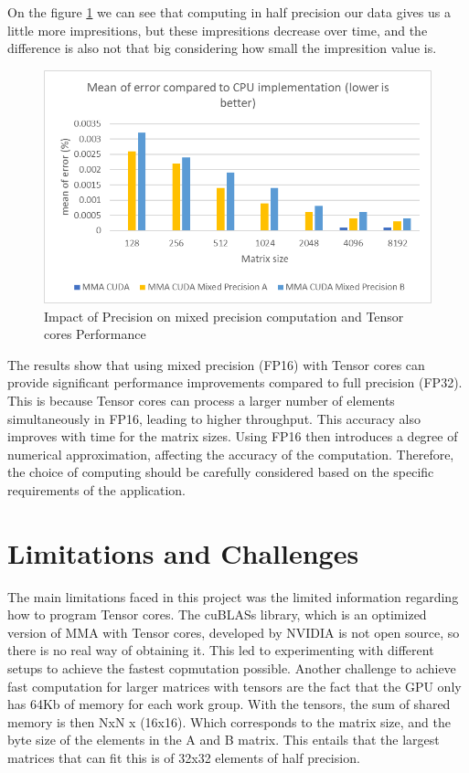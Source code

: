 \documentclass[conference]{IEEEtran}
\begin{document}
  On the figure \ref{fig:precision-impact2} we can see that computing in half precision our data gives us a little more 
  impresitions, but these impresitions decrease over time, and the difference is also not that big considering how small the 
  impresition value is.

  \begin{figure}[htbp]
    \centering
    \includegraphics[scale=0.6]{figures/Mean of error MP.png}
    \caption{Impact of Precision on mixed precision computation and Tensor cores Performance}
    \label{fig:precision-impact2}
  \end{figure}
  
  The results show that using mixed precision (FP16) with Tensor cores can provide significant performance improvements compared to full precision (FP32).
  This is because Tensor cores can process a larger number of elements simultaneously in FP16,
  leading to higher throughput. This accuracy also improves with time for the matrix sizes.
  Using FP16 then introduces a degree of numerical approximation, affecting the accuracy of the computation.
  Therefore, the choice of computing should be carefully considered based on the specific
  requirements of the application. 
  
  
  \section{Limitations and Challenges}\label{sec:limitations-challenges}
  The main limitations faced in this project was the limited information regarding how to program Tensor cores.
  The cuBLASs library, which is an optimized version of MMA with Tensor cores, developed by NVIDIA is not open source,
  so there is no real way of obtaining it. This led to experimenting with different setups to achieve the fastest copmutation possible.
  Another challenge to achieve fast computation for larger matrices with tensors are the fact that the GPU 
  only has 64Kb of memory for each work group. With the tensors, the sum of shared memory is then NxN x (16x16).
  Which corresponds to the matrix size, and the byte size of the elements in the A and B matrix. This entails that the 
  largest matrices that can fit this is of 32x32 elements of half precision.
\end{document}
